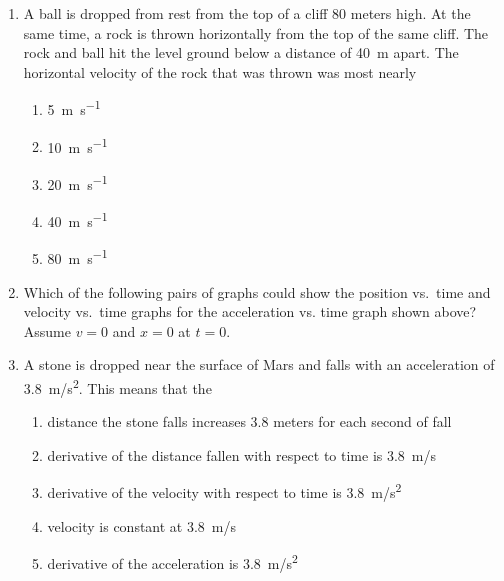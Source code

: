 \documentclass{../../../oss-apphys}
\begin{document}
\begin{multicols}{2}
\begin{enumerate}[resume,leftmargin=18pt]
  \item A ball is dropped from rest from the top of a cliff $80$ meters high. At
    the same time, a rock is thrown horizontally from the top of the same
    cliff. The rock and ball hit the level ground below a distance of
    \SI{40}{\metre} apart. The horizontal velocity of the rock that was thrown
    was most nearly
    \begin{center}
      \vspace{-.15in}
    \end{center}
    \begin{enumerate}[noitemsep,topsep=0pt,leftmargin=18pt,label=(\Alph*)]
    \item\SI{5}{\metre\per\second}
    \item\SI{10}{\metre\per\second}
    \item\SI{20}{\metre\per\second}
    \item\SI{40}{\metre\per\second}
    \item\SI{80}{\metre\per\second}
    \end{enumerate}
    \columnbreak
    
  \item Which of the following pairs of graphs could show the position vs.\
    time and velocity vs.\ time graphs for the acceleration vs. time graph
    shown above? Assume $v=0$ and $x=0$ at $t=0$.
    \begin{center}
    \end{center}

  \item A stone is dropped near the surface of Mars and falls with an
    acceleration of \SI{3.8}{m/s^2}. This means that the
    \begin{enumerate}[noitemsep,topsep=0pt,leftmargin=18pt,label=(\Alph*)]
    \item distance the stone falls increases 3.8 meters for each second of
      fall
    \item derivative of the distance fallen with respect to time is
      \SI{3.8}{m/s}
    \item derivative of the velocity with respect to time is \SI{3.8}{m/s^2}
    \item velocity is constant at \SI{3.8}{m/s}
    \item derivative of the acceleration is \SI{3.8}{m/s^2}
    \end{enumerate}    
    \columnbreak
    

\end{enumerate}
\end{multicols}
\end{document}
